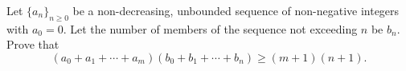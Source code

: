 Let $\{a_n\}_{n\geq 0}$ be a non-decreasing, unbounded sequence of non-negative integers with $a_0=0$. Let the number of members of the sequence not exceeding $n$ be $b_n$. Prove that \[ (a_0 + a_1 + \cdots + a_m)( b_0 + b_1 + \cdots + b_n ) \geq (m + 1)(n + 1). \]